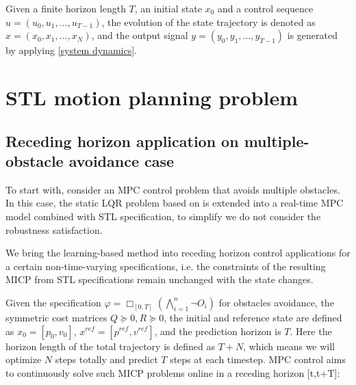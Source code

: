 \documentclass[a4paper]{report}
\begin{document}
Given a finite horizon length $T$, an initial state $x_0$ and a control sequence $u = (u_0, u_1,...,u_{T-1})$, the evolution of the state trajectory is denoted as $x = (x_0,x_1,...,x_N)$, and the output signal $y = (y_0, y_1,...,y_{T-1})$ is generated by applying \ref{system dynamics}. 

\section{STL motion planning problem}
\label{motion_planning_Problem}
\subsection{Receding horizon application on multiple-obstacle avoidance case}

To start with, consider an MPC control problem that avoids multiple obstacles. In this case, the static LQR problem based on \cite{bertsimas2022online} is extended into a real-time MPC model combined with STL specification, to simplify we do not consider the robustness satisfaction. 

We bring the learning-based method into receding horizon control applications for a certain non-time-varying specifications, i.e. the constraints
of the resulting MICP from STL specifications remain unchanged with the state changes.

Given the specification $\varphi=\Box_{[0,T]}(\bigwedge_{i=1}^n\lnot O_i)$ for obstacles avoidance, the symmetric cost matrices $Q\succeq 0,R\succeq 0 $, the initial and reference state are defined as $x_0 = [p_0,v_0]$, $x^{ref}=[p^{ref},v^{ref}]$, and the prediction horizon is $T$. Here the horizon length of the total trajectory is defined as $T+N$, which means we will optimize $N$ steps totally and predict $T$ steps at each timestep. MPC control aims to continuously solve such MICP problems online in a receding horizon [t,t+T]:
\end{document}
